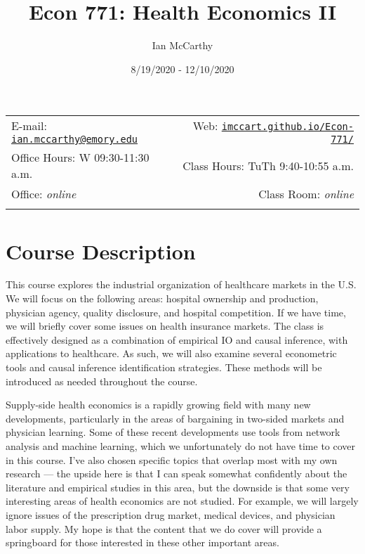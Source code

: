 \documentclass[11pt,]{article}
\title{Econ 771: Health Economics II}
\author{Ian McCarthy}
\date{8/19/2020 - 12/10/2020}
\begin{document}
  

		\maketitle
		
	
		\thispagestyle{firststyle}



	\noindent \begin{tabular*}{\textwidth}{ @{\extracolsep{\fill}} lr @{\extracolsep{\fill}}}


E-mail: \texttt{\href{mailto:ian.mccarthy@emory.edu}{\nolinkurl{ian.mccarthy@emory.edu}}} & Web: \href{http://imccart.github.io/Econ-771/}{\tt imccart.github.io/Econ-771/}\\
Office Hours: W 09:30-11:30 a.m.  &  Class Hours: TuTh 9:40-10:55 a.m.\\
Office: \emph{online}  & Class Room: \emph{online}\\
	&  \\
	\hline
	\end{tabular*}
	
\vspace{2mm}
	


\hypertarget{course-description}{%
\section{Course Description}\label{course-description}}

This course explores the industrial organization of healthcare markets
in the U.S. We will focus on the following areas: hospital ownership and
production, physician agency, quality disclosure, and hospital
competition. If we have time, we will briefly cover some issues on
health insurance markets. The class is effectively designed as a
combination of empirical IO and causal inference, with applications to
healthcare. As such, we will also examine several econometric tools and
causal inference identification strategies. These methods will be
introduced as needed throughout the course.

Supply-side health economics is a rapidly growing field with many new
developments, particularly in the areas of bargaining in two-sided
markets and physician learning. Some of these recent developments use
tools from network analysis and machine learning, which we unfortunately
do not have time to cover in this course. I've also chosen specific
topics that overlap most with my own research --- the upside here is
that I can speak somewhat confidently about the literature and empirical
studies in this area, but the downside is that some very interesting
areas of health economics are not studied. For example, we will largely
ignore issues of the prescription drug market, medical devices, and
physician labor supply. My hope is that the content that we do cover
will provide a springboard for those interested in these other important
areas.
\end{document}
